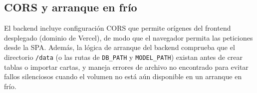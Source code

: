 \subsection{CORS y arranque en frío}

El backend incluye configuración CORS que permite orígenes del frontend desplegado (dominio de Vercel), de modo que el navegador permita las peticiones desde la SPA. Además, la lógica de arranque del backend comprueba que el directorio \texttt{/data} (o las rutas de \texttt{DB\_PATH} y \texttt{MODEL\_PATH}) existan antes de crear tablas o importar cartas, y maneja errores de archivo no encontrado para evitar fallos silenciosos cuando el volumen no está aún disponible en un arranque en frío.
